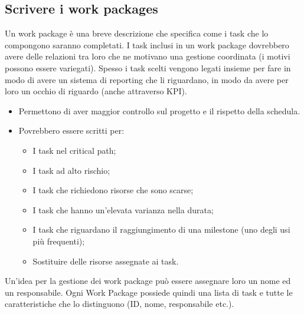 \subsection{Scrivere i work packages}
Un work package è una breve descrizione che specifica come i task che lo compongono saranno completati. I task inclusi in un work package dovrebbero avere delle relazioni tra loro che ne motivano una gestione coordinata (i motivi possono essere variegati). Spesso i task scelti vengono legati insieme per fare in modo di avere un sistema di reporting che li riguardano, in modo da avere per loro un occhio di riguardo (anche attraverso KPI).
\begin{itemize}
	\item Permettono di aver maggior controllo sul progetto e il rispetto della schedula.
	\item Povrebbero essere scritti per:
	\begin{itemize}
		\item I task nel critical path;
		\item I task ad alto rischio;
		\item I task che richiedono risorse che sono scarse;
		\item I task che hanno un’elevata varianza nella durata;
		\item I task che riguardano il raggiungimento di una milestone (uno degli usi più frequenti);
		\item Sostituire delle risorse assegnate ai task.
	\end{itemize}
\end{itemize}
Un'idea per la gestione dei work package può essere assegnare loro un nome ed un responsabile.
Ogni Work Package possiede quindi una lista di task e tutte le caratteristiche che lo distinguono (ID, nome, responsabile etc.).
